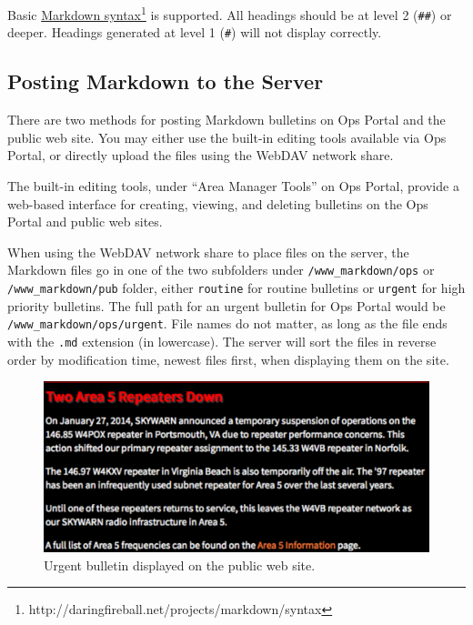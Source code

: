\documentclass[pdflatex,letterpaper,twoside,12pt]{book}
\begin{document}
Basic \href{http://daringfireball.net/projects/markdown/syntax}{Markdown syntax}\footnote{http://daringfireball.net/projects/markdown/syntax} is supported.  All headings should be at level 2 (\texttt{\#\#}) or deeper.  Headings generated at level 1 (\texttt{\#}) will not display correctly.

\subsection{Posting Markdown to the Server}

There are two methods for posting Markdown bulletins on Ops Portal and the public web site.  You may either use the built-in editing tools available via Ops Portal, or directly upload the files using the WebDAV network share.

The built-in editing tools, under ``Area Manager Tools'' on Ops Portal, provide a web-based interface for creating, viewing, and deleting bulletins on the Ops Portal and public web sites.


When using the WebDAV network share to place files on the server, the Markdown files go in one of the two subfolders under \texttt{/www\_markdown/ops} or \texttt{/www\_markdown/pub} folder, either \texttt{routine} for routine bulletins or \texttt{urgent} for high priority bulletins.  The full path for an urgent bulletin for Ops Portal would be \texttt{/www\_markdown/ops/urgent}.  File names do not matter, as long as the file ends with the \texttt{.md} extension (in lowercase).  The server will sort the files in reverse order by modification time, newest files first, when displaying them on the site.

\begin{figure}[t]
  \centering
  \includegraphics[width=\textwidth,keepaspectratio=true]{img/urgent-bulletin}
  \caption{Urgent bulletin displayed on the public web site.\label{fig:urgent-bulletin}}
\end{figure}
\end{document}
